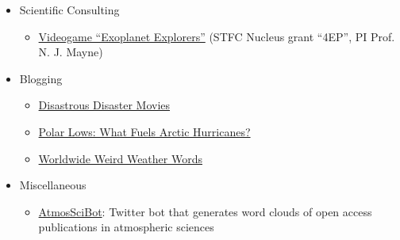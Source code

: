 \documentclass[a4paper, 11pt]{article}
\begin{document}
\begin{itemize}[nosep, leftmargin=10pt]
    \item Scientific Consulting
    \begin{itemize}
        \item \href{https://www.wethecurious.org/curious-stuff/stargazing-night-sky/exoplanet-explorers}{Videogame ``Exoplanet Explorers''} (STFC Nucleus grant ``4EP'', PI Prof. N. J. Mayne)
    \end{itemize}
    \item Blogging
    \begin{itemize}
        \item \href{http://www.scisnack.com/2015/12/17/disastrous-disaster-movies}{Disastrous Disaster Movies}
        \item \href{http://www.scisnack.com/2015/03/04/polar-lows-what-fuels-arctic-hurricanes}{Polar Lows: What Fuels Arctic Hurricanes?}
        \item \href{http://www.scisnack.com/2014/12/17/worldwide-weird-weather-words}{Worldwide Weird Weather Words}
    \end{itemize}
    \item Miscellaneous
    \begin{itemize}
        \item \href{https://twitter.com/atmosscibot}{AtmosSciBot}: Twitter bot that generates word clouds of open access publications in atmospheric sciences
    \end{itemize}
\end{itemize}

\end{document}
